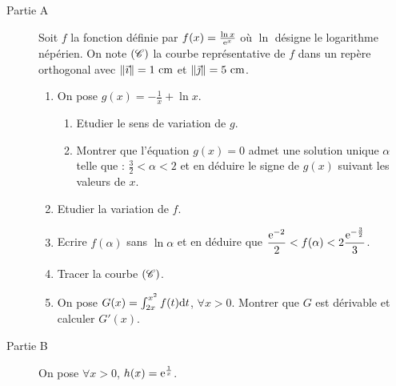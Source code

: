       \begin{description}
            \item[Partie A]
                  Soit $f$ la fonction d\'efinie par $f(x) = \frac{\ln x}{\mathrm{e}^{x}}$ 
                  o\`u $\ln$ d\'esigne le logarithme n\'ep\'erien.
                  On note $(\mathscr{C})$ la courbe repr\'esentative de $f$ dans un rep\`ere orthogonal \Oij{} avec
                  $\| \vec{\imath} \| = 1 ~\mathrm{cm}$ et $\| \vec{\jmath} \| = 5 ~\mathrm{cm}$.
                  \begin{enumerate}
                        \item On pose $g(x) = - \frac{1}{x} + \ln x$.
                              \begin{enumerate}
                                    \item Etudier le sens de variation de $g$.
                                    \item Montrer que l'\'equation $g(x) = 0$ admet une solution unique $\alpha$ telle que : 
                                          $\frac{3}{2}<\alpha<2$ et en d\'eduire le signe de $g(x)$ suivant les valeurs de $x$.
                              \end{enumerate}
                        \item Etudier la variation de $f$.
                        \item Ecrire $f(\alpha)$ sans $\ln \alpha$ et en d\'eduire que 
                              $\displaystyle{\frac{\mathrm{e}^{-2}}{2}<f(\alpha)< 2 \frac{\mathrm{e}^{-\frac{3}{2}}}{3}}$.
                        \item Tracer la courbe $(\mathscr{C})$.
                        \item On pose $G(x) = \int_{2x}^{x^2} f(t) \mathrm{d}t$, $\forall x > 0$.
                              Montrer que $G$ est d\'erivable et calculer $G'(x)$.
                  \end{enumerate}
            \item[Partie B]
                  On pose $\forall x > 0$, $h(x) = \mathrm{e}^{\frac{1}{x}}$.
\end{description}
